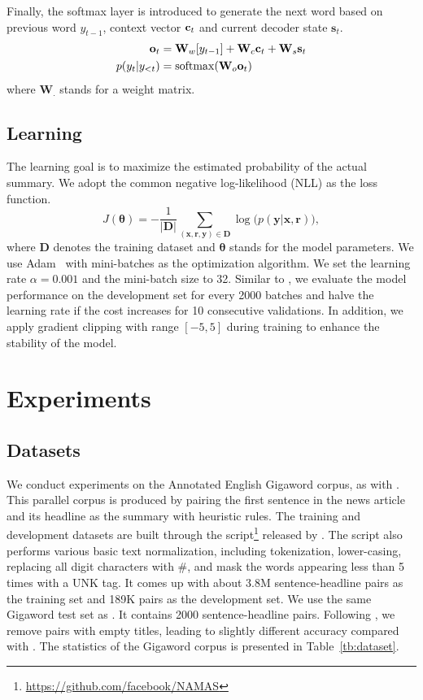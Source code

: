 \documentclass[letterpaper]{article} \usepackage{aaai18}  \usepackage{times}  \usepackage{helvet}  \usepackage{courier}  \usepackage{url}  \usepackage{graphicx}  \usepackage{amsfonts}
\begin{document}
	Finally, the softmax layer is introduced to generate the next word based on previous word $y_{t-1}$, context vector ${\bf{c}}_t$ and current decoder state $\mathbf{s}_t$.
	\begin{align}
		{{\bf{o}}_t} &= {{\bf{W}}_w}[{y_{t - 1}}] + {{\bf{W}}_c}{{\bf{c}}_t} + {{\bf{W}}_s}{{\bf{s}}_t} \\
		p({y_t}|{y_{<t}}) &= {\rm{softmax}}({{\bf{W}}_o}{{\bf{o}}_t})
	\end{align}
	where $\mathbf{W}_.$ stands for a weight matrix.
	
	\subsection{Learning}
	The learning goal is to maximize the estimated probability of the actual summary. 
	We adopt the common negative log-likelihood (NLL) as the loss function.
	\begin{equation}
		J(\mathbf{\theta} ) =  - \frac{1}{{|{\mathbf{D}}|}}\sum\limits_{({\mathbf{x}},{\mathbf{r}},{\mathbf{y}}) \in {\mathbf{D}}} {\log (p({\mathbf{y}}|{\mathbf{x}},{\mathbf{r}})} ),
	\end{equation}
	where $\mathbf{D}$ denotes the training dataset and $\mathbf{\theta}$ stands for the model parameters.
	We use Adam~\cite{kingma2014adam} with mini-batches as the optimization algorithm. 
	We set the learning rate $\alpha=0.001$ and the mini-batch size to 32.
	Similar to \cite{zhou2017selective}, we evaluate the model performance on the development set for every 2000 batches and halve the learning rate if the cost increases for 10 consecutive validations. 
	In addition, we apply gradient clipping \cite{pascanu2013difficulty} with range $[-5,5]$ during training to enhance the stability of the model.
	
	
	\section{Experiments}
	\subsection{Datasets}
	We conduct experiments on the Annotated English Gigaword corpus, as with \cite{rush-chopra-weston:2015:EMNLP}.
	This parallel corpus is produced by pairing the first sentence in the news article and its headline as the summary with heuristic rules.
	The training and development datasets are built through the script\footnote{\url{https://github.com/facebook/NAMAS}} released
	by \cite{rush-chopra-weston:2015:EMNLP}. 
	The script also performs various basic text normalization, including tokenization, lower-casing, replacing all digit characters with \#, and mask the words appearing less than 5 times with a UNK tag. 
	It comes up with about 3.8M sentence-headline pairs as the training set and 189K pairs as the development set.
	We use the same Gigaword test set as \cite{rush-chopra-weston:2015:EMNLP}.
	It contains 2000 sentence-headline pairs.
	Following \cite{rush2015neural}, we remove pairs with empty titles, leading to slightly different accuracy compared with \cite{rush-chopra-weston:2015:EMNLP}. 
	The statistics of the Gigaword corpus is presented in Table~\ref{tb:dataset}.
	
\end{document}
